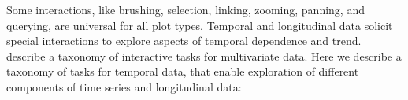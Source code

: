 \documentclass[12pt]{article}
\begin{document}



Some interactions, like brushing, selection, linking, zooming, panning, and querying, are universal for all plot types. Temporal and longitudinal data solicit special interactions to explore aspects of temporal dependence and trend. %
\citet{Buja1996} describe a taxonomy of interactive tasks for multivariate data. Here we describe a taxonomy of tasks for temporal data, that enable exploration of different components of time series and longitudinal data:

\end{document}
